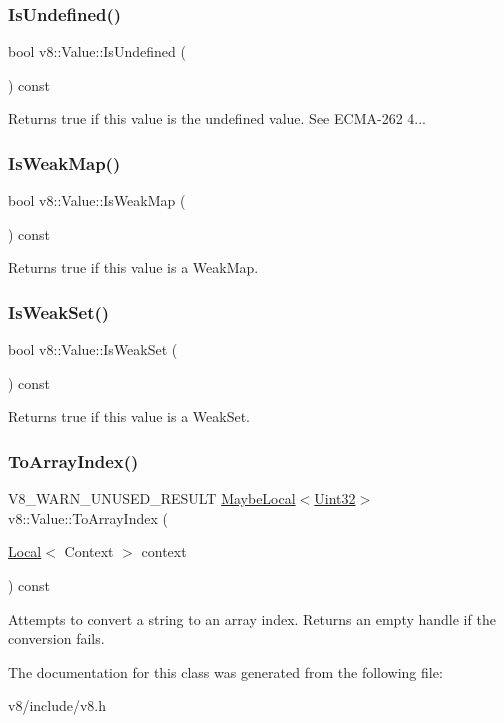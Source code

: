 \subsubsection{\texorpdfstring{Is\+Undefined()}{IsUndefined()}}
{\footnotesize\ttfamily bool v8\+::\+Value\+::\+Is\+Undefined (\begin{DoxyParamCaption}{ }\end{DoxyParamCaption}) const}

Returns true if this value is the undefined value. See E\+C\+M\+A-\/262 4... \mbox{\label{classv8_1_1Value_a3be1c8f103d9aa9b31b3b1c56905337d}} 
\subsubsection{\texorpdfstring{Is\+Weak\+Map()}{IsWeakMap()}}
{\footnotesize\ttfamily bool v8\+::\+Value\+::\+Is\+Weak\+Map (\begin{DoxyParamCaption}{ }\end{DoxyParamCaption}) const}

Returns true if this value is a Weak\+Map. \mbox{\label{classv8_1_1Value_a66c2dbb0ed13325f0f9e6b38e5e1992c}} 
\subsubsection{\texorpdfstring{Is\+Weak\+Set()}{IsWeakSet()}}
{\footnotesize\ttfamily bool v8\+::\+Value\+::\+Is\+Weak\+Set (\begin{DoxyParamCaption}{ }\end{DoxyParamCaption}) const}

Returns true if this value is a Weak\+Set. \mbox{\label{classv8_1_1Value_a3d7597e5cf475e73f127e2591d46bdf4}} 
\subsubsection{\texorpdfstring{To\+Array\+Index()}{ToArrayIndex()}}
{\footnotesize\ttfamily V8\+\_\+\+W\+A\+R\+N\+\_\+\+U\+N\+U\+S\+E\+D\+\_\+\+R\+E\+S\+U\+LT \mbox{\hyperlink{classv8_1_1MaybeLocal}{Maybe\+Local}}$<$\mbox{\hyperlink{classv8_1_1Uint32}{Uint32}}$>$ v8\+::\+Value\+::\+To\+Array\+Index (\begin{DoxyParamCaption}\item[{\mbox{\hyperlink{classv8_1_1Local}{Local}}$<$ Context $>$}]{context }\end{DoxyParamCaption}) const}

Attempts to convert a string to an array index. Returns an empty handle if the conversion fails. 

The documentation for this class was generated from the following file\+:\begin{DoxyCompactItemize}
\item 
v8/include/v8.\+h\end{DoxyCompactItemize}
